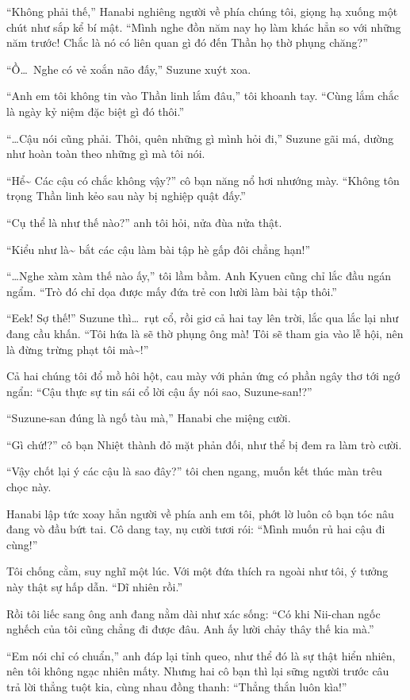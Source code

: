 \documentclass[../main.tex]{subfiles}
\begin{document}
``Không phải thế,'' Hanabi nghiêng người về phía chúng tôi, giọng hạ xuống một chút như sắp kể bí mật. ``Mình nghe đồn năm nay họ làm khác hẳn so với những năm trước! Chắc là nó có liên quan gì đó đến Thần họ thờ phụng chăng?''

``Ồ\dots\ Nghe có vẻ xoắn não đấy,'' Suzune xuýt xoa.

``Anh em tôi không tin vào Thần linh lắm đâu,'' tôi khoanh tay. ``Cùng lắm chắc là ngày kỷ niệm đặc biệt gì đó thôi.''

``\dots Cậu nói cũng phải. Thôi, quên những gì mình hỏi đi,'' Suzune gãi má, dường như hoàn toàn theo những gì mà tôi nói.

``Hể\~{} Các cậu có chắc không vậy?'' cô bạn năng nổ hơi nhướng mày. ``Không tôn trọng Thần linh kẻo sau này bị nghiệp quật đấy.''

``Cụ thể là như thế nào?'' anh tôi hỏi, nửa đùa nửa thật.

``Kiểu như là\~{} bắt các cậu làm bài tập hè gấp đôi chẳng hạn!''

``\dots Nghe xàm xàm thế nào ấy,'' tôi lầm bầm. Anh Kyuen cũng chỉ lắc đầu ngán ngẩm. ``Trò đó chỉ dọa được mấy đứa trẻ con lười làm bài tập  thôi.''

``Eek! Sợ thế!'' Suzune thì\dots\ rụt cổ, rồi giơ cả hai tay lên trời, lắc qua lắc lại như đang cầu khấn. ``Tôi hứa là sẽ thờ phụng ông mà! Tôi sẽ tham gia vào lễ hội, nên là đừng trừng phạt tôi mà\~{}!''

Cả hai chúng tôi đổ mồ hôi hột, cau mày với phản ứng có phần ngây thơ tới ngớ ngẩn: ``Cậu thực sự tin sái cổ lời cậu ấy nói sao, Suzune-san!?''

``Suzune-san đúng là ngố tàu mà,'' Hanabi che miệng cười.

``Gì chứ!?'' cô bạn Nhiệt thành đỏ mặt phản đối, như thể bị đem ra làm trò cười.

``Vậy chốt lại ý các cậu là sao đây?'' tôi chen ngang, muốn kết thúc màn trêu chọc này.

Hanabi lập tức xoay hẳn người về phía anh em tôi, phớt lờ luôn cô bạn tóc nâu đang vò đầu bứt tai. Cô dang tay, nụ cười tươi rói: ``Mình muốn rủ hai cậu đi cùng!''

Tôi chống cằm, suy nghĩ một lúc. Với một đứa thích ra ngoài như tôi, ý tưởng này thật sự hấp dẫn. ``Dĩ nhiên rồi.''

Rồi tôi liếc sang ông anh đang nằm dài như xác sống: ``Có khi Nii-chan ngốc nghếch của tôi cũng chẳng đi được đâu. Anh ấy lười chảy thây thế kia mà.''

``Em nói chỉ có chuẩn,'' anh đáp lại tỉnh queo, như thể đó là sự thật hiển nhiên, nên tôi không ngạc nhiên mấty. Nhưng hai cô bạn thì lại sững người trước câu trả lời thẳng tuột kia, cùng nhau đồng thanh: ``Thẳng thắn luôn kìa!''
\end{document}
